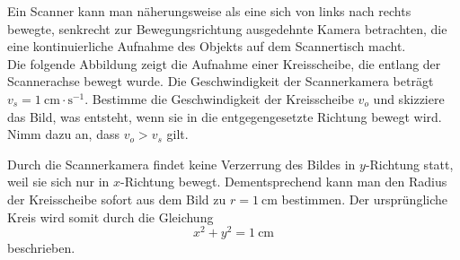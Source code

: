 \begin{minipage}[b]{0.6\textwidth}
\begin{Exercise}[label = rollingshutter, origin = Aaron Wild, difficulty = 3, title = Scannerlaufband]
	Ein Scanner kann man näherungsweise als eine sich von links nach rechts bewegte, senkrecht zur Bewegungsrichtung ausgedehnte Kamera betrachten, die eine kontinuierliche Aufnahme des Objekts auf dem Scannertisch macht.\\
	Die folgende Abbildung zeigt die Aufnahme einer Kreisscheibe, die entlang der Scannerachse bewegt wurde. Die Geschwindigkeit der Scannerkamera beträgt $v_s = 1~\mathrm{cm\cdot s^{-1}}$.
	Bestimme die Geschwindigkeit der Kreisscheibe $v_o$ und skizziere das Bild, was entsteht, wenn sie in die entgegengesetzte Richtung bewegt wird. Nimm dazu an, dass $v_o > v_s$ gilt.
\end{Exercise}
\end{minipage}
\begin{minipage}[b]{0.4\textwidth}
	\centering
{}
\end{minipage}

\begin{Answer}[ref = rollingshutter]
	Durch die Scannerkamera findet keine Verzerrung des Bildes in $y$-Richtung statt, weil sie sich nur in $x$-Richtung bewegt. Dementsprechend kann man den Radius der Kreisscheibe sofort aus dem Bild zu $r = 1~\mathrm{cm}$ bestimmen. Der ursprüngliche Kreis wird somit durch die Gleichung 
	\begin{equation}\label{rollingshutter: circle}
		x^2 + y^2 = 1 ~\mathrm{cm}
	\end{equation}
	beschrieben.\\

	
\end{Answer}